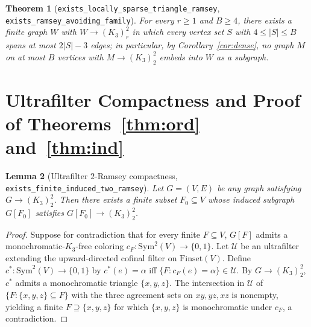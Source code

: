 \documentclass[11pt]{amsart}
\newtheorem{theorem}{Theorem}
\newtheorem{lemma}[theorem]{Lemma}
\theoremstyle{definition}
\theoremstyle{remark}
\begin{document}
\begin{theorem}[\texttt{exists\_locally\_sparse\_triangle\_ramsey}, \texttt{exists\_ramsey\_avoiding\_family}]\label{thm:avoid}
For every $r \ge 1$ and $B \ge 4$, there exists a finite graph $W$ with $W \to (K_3)^2_r$ in which every vertex set $S$ with $4 \le |S| \le B$ spans at most $2|S| - 3$ edges; in particular, by Corollary~\ref{cor:dense}, no graph $M$ on at most $B$ vertices with $M \to (K_3)^2_2$ embeds into $W$ as a subgraph.
\end{theorem}

\section{Ultrafilter Compactness and Proof of Theorems~\ref{thm:ord} and~\ref{thm:ind}}

\begin{lemma}[Ultrafilter $2$-Ramsey compactness, \texttt{exists\_finite\_induced\_two\_ramsey}]\label{lem:compact}
Let $G = (V, E)$ be any graph satisfying $G \to (K_3)^2_2$. Then there exists a finite subset $F_0 \subseteq V$ whose induced subgraph $G[F_0]$ satisfies $G[F_0] \to (K_3)^2_2$.
\end{lemma}

\begin{proof}
Suppose for contradiction that for every finite $F \subseteq V$, $G[F]$ admits a monochromatic-$K_3$-free coloring $c_F : \mathrm{Sym}^2(V) \to \{0, 1\}$. Let $\mathcal{U}$ be an ultrafilter extending the upward-directed cofinal filter on $\mathrm{Finset}(V)$. Define $c^* : \mathrm{Sym}^2(V) \to \{0, 1\}$ by $c^*(e) = \alpha$ iff $\{F : c_F(e) = \alpha\} \in \mathcal{U}$. By $G \to (K_3)^2_2$, $c^*$ admits a monochromatic triangle $\{x, y, z\}$. The intersection in $\mathcal{U}$ of $\{F : \{x, y, z\} \subseteq F\}$ with the three agreement sets on $x y, y z, x z$ is nonempty, yielding a finite $F \supseteq \{x, y, z\}$ for which $\{x, y, z\}$ is monochromatic under $c_F$, a contradiction.
\end{proof}
\end{document}
